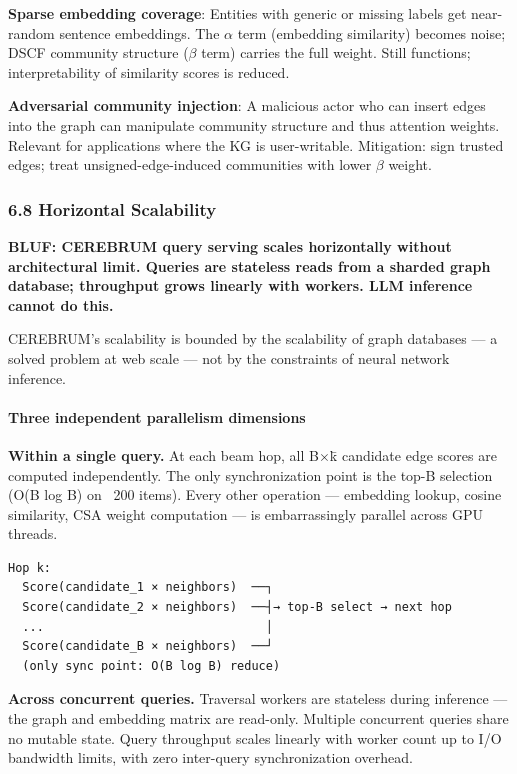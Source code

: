\documentclass[10pt,journal,compsoc]{IEEEtran}
\begin{document}
\textbf{Sparse embedding coverage}: Entities with generic or missing labels get
near-random sentence embeddings. The $\alpha$ term (embedding similarity) becomes
noise; DSCF community structure ($\beta$ term) carries the full weight. Still
functions; inter\-pretability of similarity scores is reduced.

\textbf{Adversarial community injection}: A malicious actor who can insert edges
into the graph can manipulate community structure and thus attention weights.
Relevant for appli\-cations where the KG is user-writable. Mitigation: sign
trusted edges; treat unsigned-edge-induced communities with lower $\beta$ weight.

\subsubsection{6.8 Horizontal Scalability}

\textbf{BLUF: CEREBRUM query serving scales horiz\-ontally without archi\-tectural limit. Queries are stateless reads from a sharded graph database; throughput grows linearly with workers. LLM inference cannot do this.}

CEREBRUM's scalability is bounded by the scalability of graph databases — a solved problem at web scale — not by the constraints of neural network inference.

\paragraph{Three independent parallelism dimensions}

\textbf{Within a single query.} At each beam hop, all B$\times$k̄ candidate edge scores are computed indep\-endently. The only synch\-ronization point is the top-B selection (O(B log B) on ~200 items). Every other operation — embedding lookup, cosine similarity, CSA weight computation — is embar\-rassingly parallel across GPU threads.

\begin{lstlisting}
Hop k:
  Score(candidate_1 × neighbors)  ──┐
  Score(candidate_2 × neighbors)  ──┤→ top-B select → next hop
  ...                               │
  Score(candidate_B × neighbors)  ──┘
  (only sync point: O(B log B) reduce)
\end{lstlisting}

\textbf{Across concurrent queries.} Traversal workers are stateless during inference — the graph and embedding matrix are read-only. Multiple concurrent queries share no mutable state. Query throughput scales linearly with worker count up to I/O bandwidth limits, with zero inter-query synch\-ronization overhead.
\end{document}
